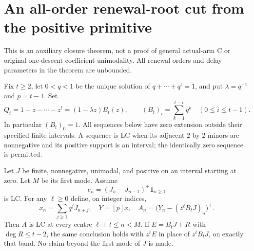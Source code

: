 \section{An all-order renewal-root cut from the positive primitive}
This is an auxiliary closure theorem, not a proof of general actual-arm
C or original one-descent coefficient unimodality. All renewal orders
and delay parameters in the theorem are unbounded.

Fix $t\ge2$, let $0<q<1$ be the unique solution of
$q+\cdots+q^t=1$, and put $\lambda=q^{-1}$ and $p=t-1$. Set
\[
 Q_t=1-z-\cdots-z^t=(1-\lambda z)B_t(z),\qquad
 (B_t)_i=\sum_{k=1}^{t-i}q^k\quad(0\le i\le t-1).
\]
In particular $(B_t)_0=1$. All sequences below have zero extension
outside their specified finite intervals. A sequence is LC when its
adjacent $2$ by $2$ minors are nonnegative and its positive support is
an interval; the identically zero sequence is permitted.

\begin{theorem}
Let $J$ be finite, nonnegative, unimodal, and positive on an interval
starting at zero. Let $M$ be its first mode. Assume
\[
 e_n=(J_n-J_{n-1})^+\boldsymbol1_{n\ge1}
\]
is LC. For any $\ell\ge0$ define, on integer indices,
\[
 x_n=\sum_{j\ge1}q^jJ_{n+j},\quad Y=[p]x,\quad
 A_n=\bigl(Y_n-(z^\ell B_tJ)_n\bigr)^+.
\]
Then $A$ is LC at every centre $\ell+t\le n<M$.
If $E=B_tJ+R$ with $\deg R\le t-2$, the same conclusion holds
with $z^\ell E$ in place of $z^\ell B_tJ$, on exactly that band.
No claim beyond the first mode of $J$ is made.
\end{theorem}

